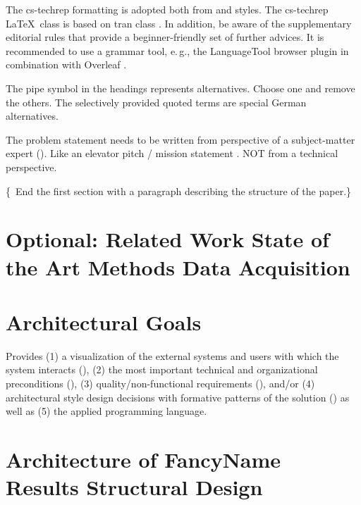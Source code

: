 \documentclass[conference,a4paper,flushend]{cs-techrep} %
\begin{document}
The cs-techrep formatting is adopted both from  \cite{ieee2018formattingrules} and  \cite{iaria2014formattingrules} styles.
The cs-techrep \LaTeX\ class is based on tran class \cite{ieee2015howto}.
In addition, be aware of the supplementary  editorial rules \cite{iaria2009editorialrules} \faWarning{} that provide a beginner-friendly set of further advices.
It is recommended to use a grammar tool, e.\,g., the LanguageTool \cite{languagetool} browser plugin in combination with Overleaf \cite{overleaf}.

The pipe symbol \textquote{\textbar{}} in the headings represents alternatives. Choose one and remove the others. The selectively provided quoted terms are special German alternatives.

The problem statement needs to be written from perspective of a subject-matter expert (). Like an elevator pitch / mission statement \faWarning{}. NOT from a technical perspective.

\{\,\faWarning{} End the first section with a paragraph describing the structure of the paper.\}

\section{Optional: Related Work \textbar{} State of the Art \textbar{} Methods \textbar{} Data Acquisition}
\lipsum[12]

\section{Architectural Goals} %
Provides
(1) a visualization of the external systems and users with which the system interacts (),
(2) the most important technical and organizational preconditions (),
(3) quality/non-functional requirements (), and/or
(4) architectural style design decisions with formative patterns of the solution ()
as well as (5) the applied programming language.

\section{Architecture of FancyName \textbar{} Results \textbar{} Structural Design \textbar{}  }
\end{document}
